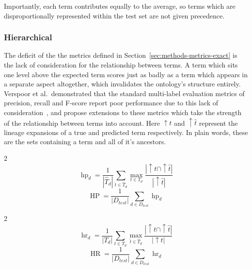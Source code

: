 \documentclass[11pt]{article}
\theoremstyle{plain}
\theoremstyle{definition}
\begin{document}
Importantly, each term contributes equally to the average, so terms which are disproportionally represented within the test set are not given precedence.

\subsubsection{Hierarchical}\label{sec:methods-metrics-hierarchical}

The deficit of the the metrics defined in Section~\ref{sec:methods-metrics-exact} is the lack of consideration for the relationship between terms. A term which sits one level above the expected term scores just as badly as a term which appears in a separate aspect altogether, which invalidates the ontology's structure entirely. Verspoor et al.\ demonstrated that the standard multi-label evaluation metrics of precision, recall and F-score report poor performance due to this lack of consideration~\cite{verspoor/2006/categorization}, and propose extensions to these metrics which take the strength of the relationship between terms into account. Here ${\uparrow} t$ and ${\uparrow} \hat{t}$ represent the lineage expansions of a true and predicted term respectively. In plain words, these are the sets containing a term and all of it's ancestors.

\begin{multicols}{2}
    \begin{equation}\label{eq:hpd}
        \operatorname{hp}_d = \frac{1}{|\hat{T}_d|} \sum_{\hat{t} \in \hat{T}_d} \max_{t \in T_d} \frac{|{\uparrow} t \cap  {\uparrow} \hat{t}|}{|{\uparrow} \hat{t}|}
    \end{equation}
    \break{}
    \begin{equation}\label{eq:hp}
        \operatorname{HP} = \frac{1}{|D_{test}|} \sum_{d \in D_{test}} \operatorname{hp}_d
    \end{equation}
\end{multicols}

\begin{multicols}{2}
    \begin{equation}\label{eq:hrd}
        \operatorname{hr}_d = \frac{1}{|T_d|} \sum_{t \in T_d} \max_{\hat{t} \in \hat{T}_d} \frac{|{\uparrow} t \cap  {\uparrow} \hat{t}|}{|{\uparrow} t|}
    \end{equation}
    \break{}
    \begin{equation}\label{eq:hr}
        \operatorname{HR} = \frac{1}{|D_{test}|} \sum_{d \in D_{test}} \operatorname{hr}_d
    \end{equation}
\end{multicols}
\end{document}
